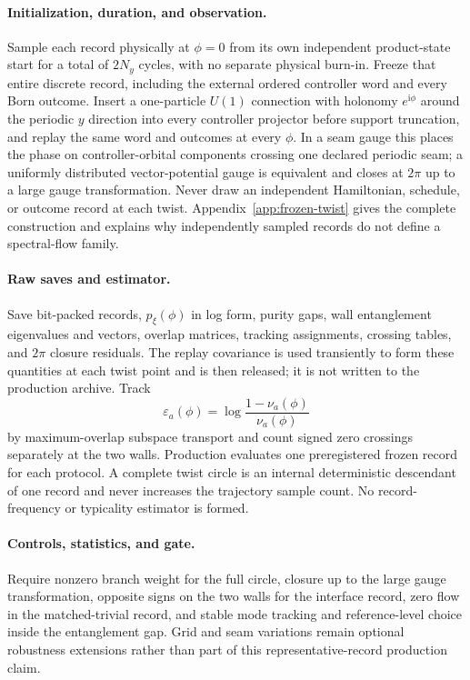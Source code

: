 \documentclass[aps,prx,twocolumn,floatfix,nofootinbib,superscriptaddress,longbibliography]{revtex4-2}
\newcommand{\ii}{\boldsymbol{\mathrm{i}}}
\begin{document}
\paragraph*{Initialization, duration, and observation.}
Sample each record physically at $\phi=0$ from its own independent product-state start for
a total of $2N_y$ cycles, with no separate physical burn-in.  Freeze that entire discrete
record, including the external ordered controller word and every Born outcome.  Insert a
one-particle $U(1)$ connection with holonomy $e^{\ii\phi}$ around the
periodic $y$ direction into every controller projector before support truncation, and
replay the same word and outcomes at every $\phi$.  In a seam gauge this places the phase
on controller-orbital components crossing one declared periodic seam; a uniformly
distributed vector-potential gauge is equivalent and closes at $2\pi$ up to a large gauge
transformation.  Never draw an independent Hamiltonian, schedule, or outcome record at
each twist.  Appendix~\ref{app:frozen-twist} gives the complete construction and explains
why independently sampled records do not define a spectral-flow family.

\paragraph*{Raw saves and estimator.}
Save bit-packed records, $p_\xi(\phi)$ in log form, purity gaps, wall entanglement
eigenvalues and vectors, overlap matrices, tracking assignments, crossing tables, and
$2\pi$ closure residuals.  The replay covariance is used transiently to form these
quantities at each twist point and is then released; it is not written to the production
archive.  Track
\begin{equation}
 \varepsilon_a(\phi)=\log\frac{1-\nu_a(\phi)}{\nu_a(\phi)}
\end{equation}
by maximum-overlap subspace transport and count signed zero crossings separately at the two
walls.  Production evaluates one preregistered frozen record for each protocol.  A complete
twist circle is an internal deterministic descendant of one record and never increases the
trajectory sample count.  No record-frequency or typicality estimator is formed.

\paragraph*{Controls, statistics, and gate.}
Require nonzero branch weight for the full circle, closure up to the large gauge
transformation, opposite signs on the two walls for the interface record, zero flow in the
matched-trivial record, and stable mode tracking and reference-level choice inside the
entanglement gap.  Grid and seam variations remain optional robustness extensions rather
than part of this representative-record production claim.
\end{document}
